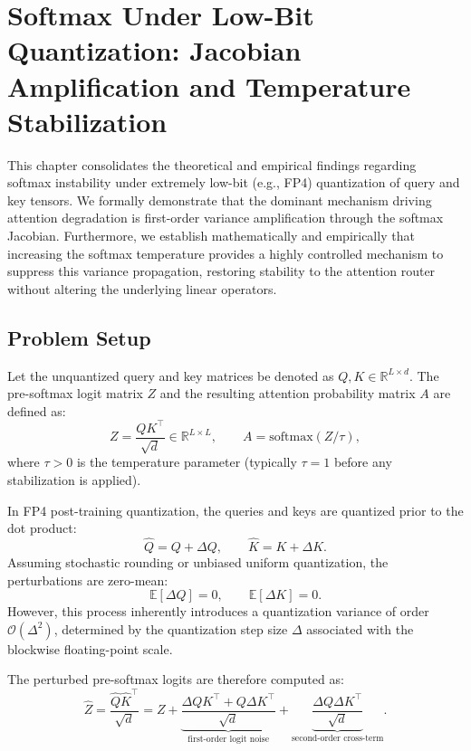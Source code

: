 \chapter{Softmax Under Low-Bit Quantization: Jacobian Amplification and Temperature Stabilization}
\label{ch:softmax_fp4_analysis}

This chapter consolidates the theoretical and empirical findings regarding
softmax instability under extremely low-bit (e.g., FP4) quantization of query and key tensors.
We formally demonstrate that the dominant mechanism driving attention degradation is first-order variance amplification
through the softmax Jacobian. Furthermore, we establish mathematically and empirically that increasing the softmax temperature
provides a highly controlled mechanism to suppress this variance propagation, restoring stability to the attention router without altering the underlying linear operators.

\section{Problem Setup}

Let the unquantized query and key matrices be denoted as $Q, K \in \mathbb{R}^{L \times d}$. The pre-softmax logit matrix $Z$ and the resulting attention probability matrix $A$ are defined as:
\[
Z = \frac{QK^\top}{\sqrt{d}} \in \mathbb{R}^{L \times L},
\qquad
A = \mathrm{softmax}(Z/\tau),
\]
where $\tau > 0$ is the temperature parameter (typically $\tau=1$ before any stabilization is applied).

In FP4 post-training quantization, the queries and keys are quantized prior to the dot product:
\[
\widehat{Q} = Q + \Delta Q,
\qquad
\widehat{K} = K + \Delta K.
\]
Assuming stochastic rounding or unbiased uniform quantization, the perturbations are zero-mean:
\[
\mathbb{E}[\Delta Q] = 0,
\qquad
\mathbb{E}[\Delta K] = 0.
\]
However, this process inherently introduces a quantization variance of order $\mathcal{O}(\Delta^2)$, determined by the quantization step size $\Delta$ associated with the blockwise floating-point scale.

The perturbed pre-softmax logits are therefore computed as:
\begin{equation}
\widehat{Z}
=
\frac{\widehat{Q}\widehat{K}^\top}{\sqrt{d}}
=
Z
+
\underbrace{\frac{\Delta Q K^\top + Q \Delta K^\top}{\sqrt{d}}}_{\text{first-order logit noise}}
+
\underbrace{\frac{\Delta Q \Delta K^\top}{\sqrt{d}}}_{\text{second-order cross-term}}.
\label{eq:qk_noise}
\end{equation}

